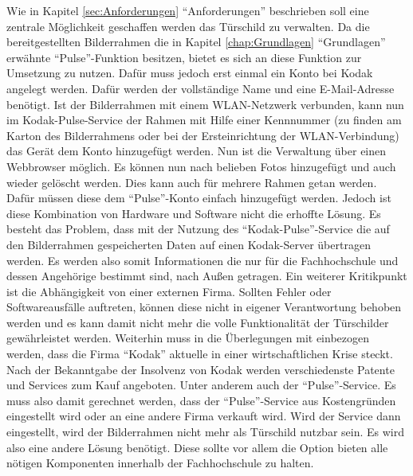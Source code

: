 \begin{flushleft}
Wie in Kapitel \ref{sec:Anforderungen} ``Anforderungen'' beschrieben soll eine zentrale Möglichkeit geschaffen werden das Türschild zu verwalten. Da die bereitgestellten Bilderrahmen die in Kapitel \ref{chap:Grundlagen} ``Grundlagen'' erwähnte ``Pulse''-Funktion besitzen, bietet es sich an diese Funktion zur Umsetzung zu nutzen. Dafür muss jedoch erst einmal ein Konto bei Kodak angelegt werden. Dafür werden der vollständige Name und eine E-Mail-Adresse benötigt. Ist der Bilderrahmen mit einem WLAN-Netzwerk verbunden, kann nun im Kodak-Pulse-Service der Rahmen mit Hilfe einer Kennnummer (zu finden am Karton des Bilderrahmens oder bei der Ersteinrichtung der WLAN-Verbindung) das Gerät dem Konto hinzugefügt werden. Nun ist die Verwaltung über einen Webbrowser möglich. Es können nun nach belieben Fotos hinzugefügt und auch wieder gelöscht werden. Dies kann auch für mehrere Rahmen getan werden. Dafür müssen diese dem ``Pulse''-Konto einfach hinzugefügt werden. 
Jedoch ist diese Kombination von Hardware und Software nicht die erhoffte Lösung. Es besteht das Problem, dass mit der Nutzung des ``Kodak-Pulse''-Service die auf den Bilderrahmen gespeicherten Daten auf einen Kodak-Server übertragen werden. Es werden also somit Informationen die nur für die Fachhochschule und dessen Angehörige bestimmt sind, nach Außen getragen. Ein weiterer Kritikpunkt ist die Abhängigkeit von einer externen Firma. Sollten Fehler oder Softwareausfälle auftreten, können diese nicht in eigener Verantwortung behoben werden und es kann damit nicht mehr die volle Funktionalität der Türschilder gewährleistet werden. Weiterhin muss in die Überlegungen mit einbezogen werden, dass die Firma ``Kodak'' aktuelle in einer wirtschaftlichen Krise steckt. Nach der Bekanntgabe der Insolvenz von Kodak werden verschiedenste Patente und Services zum Kauf angeboten. Unter anderem auch der ``Pulse''-Service. Es muss also damit gerechnet werden, dass der ``Pulse''-Service aus Kostengründen eingestellt wird oder an eine andere Firma verkauft wird. Wird der Service dann eingestellt, wird der Bilderrahmen nicht mehr als Türschild nutzbar sein. 
Es wird also eine andere Lösung benötigt. Diese sollte vor allem die Option bieten alle nötigen Komponenten innerhalb der Fachhochschule zu halten.  


\end{flushleft}
